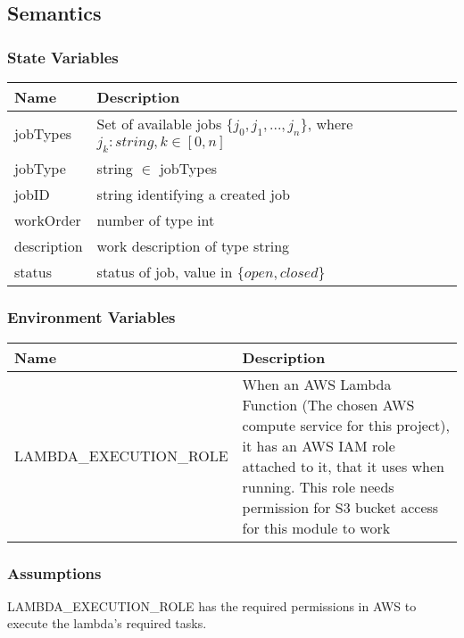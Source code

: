 \documentclass[12pt, titlepage]{article}
\begin{document}
\subsection{Semantics}

\subsubsection{State Variables}

\begin{center}
  \begin{tabular}{p{4cm} p{12cm}}
    \hline
    \textbf{Name} & \textbf{Description} \\
    \hline
    jobTypes & Set of available jobs $\{j_0, j_1, ..., j_n\}$, where
    $j_k:string, k\in[0,n]$ \\
    jobType & string $\in$ jobTypes \\
    jobID & string identifying a created job \\
    workOrder & number of type int \\
    description & work description of type string \\
    status & status of job, value in $\{open, closed$\}\\
    \hline
  \end{tabular}
\end{center}

\subsubsection{Environment Variables}

\begin{center}
  \begin{tabular}{p{6cm} p{10cm}}
    \hline
    \textbf{Name} & \textbf{Description} \\
    \hline
    LAMBDA\_EXECUTION\_ROLE & When an AWS Lambda Function (The chosen
    AWS compute service for this project), it has an AWS IAM role
    attached to it, that it uses when running. This role needs
    permission for S3 bucket access for this module to work \\
    \hline
  \end{tabular}
\end{center}

\subsubsection{Assumptions}

LAMBDA\_EXECUTION\_ROLE has the required permissions in AWS to
execute the lambda's required tasks.
\end{document}
